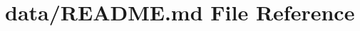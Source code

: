 \hypertarget{data_2README_8md}{}\section{data/\+R\+E\+A\+D\+ME.md File Reference}
\label{data_2README_8md}
